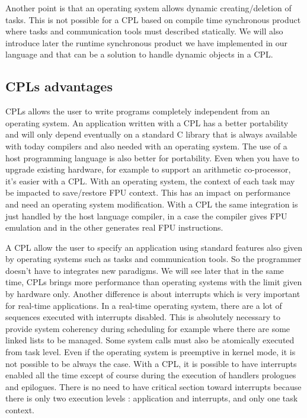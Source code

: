 \documentclass[10pt]{report}
\begin{document}
Another point is that an operating system allows dynamic creating/deletion of tasks. This is not possible for a CPL
based on compile time synchronous product where tasks and communication tools must described statically. We will also
introduce later the runtime synchronous product we have implemented in our language and that can be a solution
to handle dynamic objects in a CPL.

\subsection{CPLs advantages}

CPLs allows the user to write programs completely independent from an operating system. An application written with a CPL
has a better portability and will only depend eventually on a standard C library that is always available with today
compilers and also needed with an operating system. The use of a host programming language is also better for portability.
Even when you have to upgrade existing hardware, for example to support an arithmetic co-processor, it's easier with
a CPL. With an operating system, the context of each task may be impacted to save/restore FPU context. This has an
impact on performance and need an operating system modification. With a CPL the same integration is just handled
by the host language compiler, in a case the compiler gives FPU emulation and in the other generates real FPU instructions.

A CPL allow the user to specify an application using standard features also given by operating systems such as tasks
and communication tools. So the programmer doesn't have to integrates new paradigms. We will see later that in the same
time, CPLs brings more performance than operating systems with the limit given by hardware only. Another difference
is about interrupts which is very important for real-time applications. In a real-time operating system, there are
a lot of sequences executed with interrupts disabled. This is absolutely necessary to provide system coherency
during scheduling for example where there are some linked lists to be managed. Some system calls must also be
atomically executed from task level. Even if the operating system is preemptive in kernel mode, it is not possible
to be always the case. With a CPL, it is possible to have interrupts enabled all the time except of course during
the execution of handlers prologues and epilogues. There is no need to have critical section toward interrupts
because there is only two execution levels : application and interrupts, and only one task context.
\end{document}
